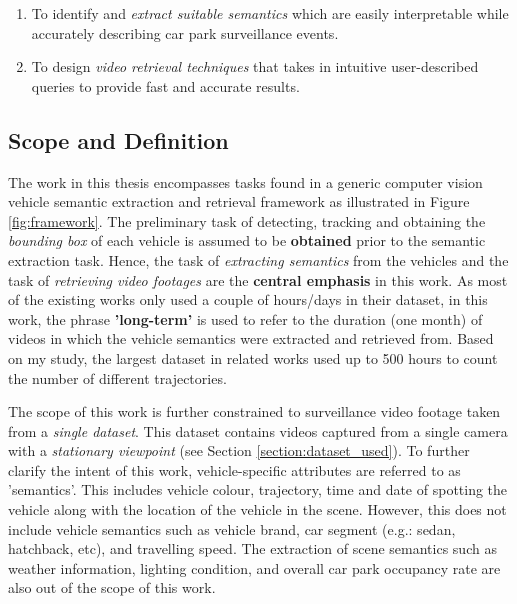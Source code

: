 \begin{enumerate}
  \item To identify and \textit{extract suitable semantics} which are easily interpretable while accurately describing car park surveillance events.
  \item To design \textit{video retrieval techniques} that takes in intuitive user-described queries to provide fast and accurate results.
\end{enumerate}

\subsection{Scope and Definition}
\label{subsec:scope}
The work in this thesis encompasses tasks found in a generic computer vision vehicle semantic extraction and retrieval framework as illustrated in Figure \ref{fig:framework}. The preliminary task of detecting, tracking and obtaining the \textit{bounding box} of each vehicle is assumed to be \textbf{obtained} prior to the semantic extraction task.
Hence, the task of \textit{extracting semantics} from the vehicles and the task of \textit{retrieving video footages} are the \textbf{central emphasis} in this work.
As most of the existing works only used a couple of hours/days in their dataset, in this work, the phrase \textbf{'long-term'} is used to refer to the duration (one month) of videos in which the vehicle semantics were extracted and retrieved from. Based on my study, the largest dataset in related works used up to 500 hours to count the number of different trajectories.


The scope of this work is further constrained to surveillance video footage taken from a \textit{single dataset}. This dataset contains videos captured from a single camera with a \textit{stationary viewpoint} (see Section \ref{section:dataset_used}). To further clarify the intent of this work, vehicle-specific attributes are referred to as 'semantics'. This includes vehicle colour, trajectory, time and date of spotting the vehicle along with the location of the vehicle in the scene. However, this does not include vehicle semantics such as vehicle brand, car segment (e.g.: sedan, hatchback, etc), and travelling speed. The extraction of scene semantics such as weather information, lighting condition, and overall car park occupancy rate are also out of the scope of this work.


